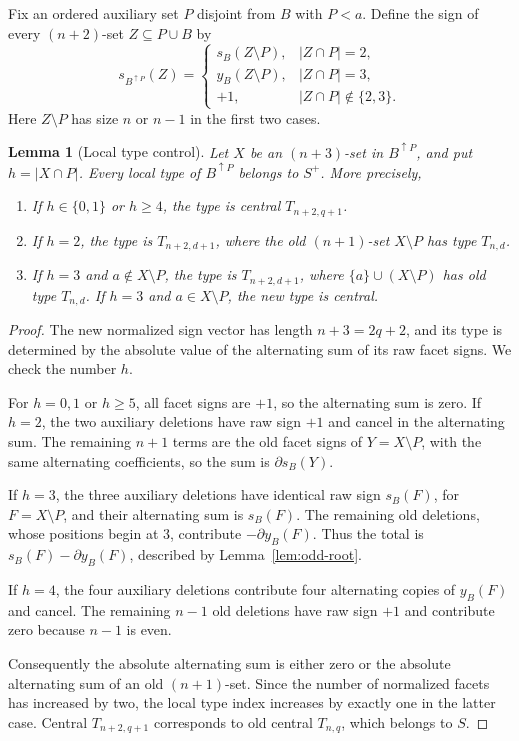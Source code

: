 \documentclass[11pt,a4paper]{article}
\newtheorem{lemma}[theorem]{Lemma}
\theoremstyle{remark}
\begin{document}
Fix an ordered auxiliary set $P$ disjoint from $B$ with $P<a$.
Define the sign of every $(n+2)$-set $Z\subseteq P\cup B$ by
\[
 s_{B^{\uparrow P}}(Z)=
 \begin{cases}
 s_B(Z\setminus P),& |Z\cap P|=2,\\
 y_B(Z\setminus P),& |Z\cap P|=3,\\
 +1,& |Z\cap P|\notin\{2,3\}.
 \end{cases}
 \tag{2.3}\label{eq:padding}
\]
Here $Z\setminus P$ has size $n$ or $n-1$ in the first two cases.

\begin{lemma}[Local type control]\label{lem:odd-types}
Let $X$ be an $(n+3)$-set in $B^{\uparrow P}$, and put
$h=|X\cap P|$. Every local type of $B^{\uparrow P}$ belongs to $S^+$.
More precisely,
\begin{enumerate}
\item If $h\in\{0,1\}$ or $h\ge4$, the type is central $T_{n+2,q+1}$.
\item If $h=2$, the type is $T_{n+2,d+1}$, where the old
$(n+1)$-set $X\setminus P$ has type $T_{n,d}$.
\item If $h=3$ and $a\notin X\setminus P$, the type is $T_{n+2,d+1}$,
where $\{a\}\cup(X\setminus P)$ has old type $T_{n,d}$.
If $h=3$ and $a\in X\setminus P$, the new type is central.
\end{enumerate}
\end{lemma}
\begin{proof}
The new normalized sign vector has length $n+3=2q+2$, and its
type is determined by the absolute value of the alternating sum of its
raw facet signs. We check the number $h$.

For $h=0,1$ or $h\ge5$, all facet signs are $+1$, so the alternating
sum is zero. If $h=2$, the two auxiliary deletions have raw sign $+1$
and cancel in the alternating sum. The remaining $n+1$ terms are the
old facet signs of $Y=X\setminus P$, with the same alternating
coefficients, so the sum is $\partial s_B(Y)$.

If $h=3$, the three auxiliary deletions have identical raw sign
$s_B(F)$, for $F=X\setminus P$, and their alternating sum is $s_B(F)$.
The remaining old deletions, whose positions begin at $3$, contribute
$-\partial y_B(F)$. Thus the total is
$s_B(F)-\partial y_B(F)$, described by Lemma~\ref{lem:odd-root}.

If $h=4$, the four auxiliary deletions contribute four alternating
copies of $y_B(F)$ and cancel. The remaining $n-1$ old deletions
have raw sign $+1$ and contribute zero because $n-1$ is even.

Consequently the absolute alternating sum is either zero or the
absolute alternating sum of an old $(n+1)$-set. Since the number of
normalized facets has increased by two, the local type index
increases by exactly one in the latter case. Central $T_{n+2,q+1}$
corresponds to old central $T_{n,q}$, which belongs to $S$.
\end{proof}
\end{document}

